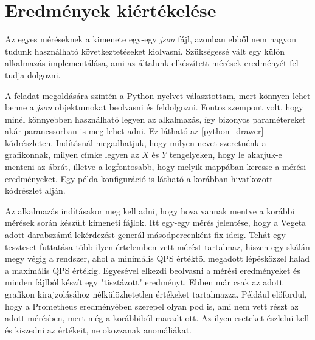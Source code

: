 \section{Eredmények kiértékelése}
Az egyes méréseknek a kimenete egy-egy \textit{json} fájl, azonban ebből nem nagyon tudunk használható következtetéseket kiolvasni. Szükségessé vált egy külön alkalmazás implementálása, ami az általunk elkészített mérések eredményét fel tudja dolgozni. 

A feladat megoldására szintén a Python nyelvet választottam, mert könnyen lehet benne a \textit{json} objektumokat beolvasni és feldolgozni.
Fontos szempont volt, hogy minél könnyebben használható legyen az alkalmazás, így bizonyos paramétereket akár parancssorban is meg lehet adni. Ez látható az \ref{python_drawer} kódrészleten. Indításnál megadhatjuk, hogy milyen nevet szeretnénk a grafikonnak, milyen címke legyen az $X$ és $Y$ tengelyeken, hogy le akarjuk-e menteni az ábrát, illetve a legfontosabb, hogy melyik mappában keresse a mérési eredményeket. Egy példa konfiguráció is látható a korábban hivatkozott kódrészlet alján. \\

\lstset{caption=Eredményeket feldolgozó alkalmazás használata, label=python_drawer}


Az alkalmazás indításakor meg kell adni, hogy hova vannak mentve a korábbi mérések során készült kimeneti fájlok. Itt egy-egy mérés jelentése, hogy a Vegeta adott darabszámú lekérdezést generál másodpercenként fix ideig. Tehát egy teszteset futtatása több ilyen értelemben vett mérést tartalmaz, hiszen egy skálán megy végig a rendszer, ahol a minimális QPS értéktől megadott lépésközzel halad a maximális QPS értékig. 
Egyesével elkezdi beolvasni a mérési eredményeket és minden fájlból készít egy "tisztázott" eredményt. Ebben már csak az adott grafikon kirajzolásához nélkülözhetetlen értékeket tartalmazza. Például előfordul, hogy a Prometheus eredményében szerepel olyan pod is, ami nem vett részt az adott mérésben, mert még a korábbiból maradt ott. Az ilyen eseteket észlelni kell és kiszedni az értékeit, ne okozzanak anomáliákat. 

